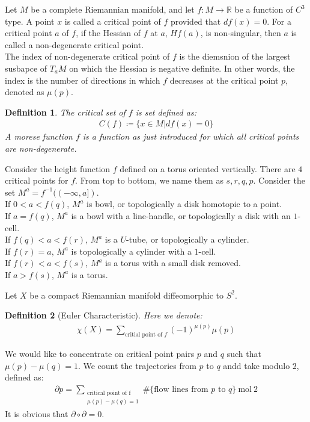 \documentclass[11pt]{book}
\theoremstyle{break}
\theoremstyle{break}
\newtheorem{defn}{Definition}[corL]
\newcommand{\R}{\mathbb{R}}
\newcommand{\pd}{\partial}
\begin{document}
\newpage
Let $M$ be a complete Riemannian manifold, and let $f:M \to \R$ be a function of $C^3$ type. A point $x$ is called a critical point of $f$ provided that $df(x) = 0$. For a critical point $a$ of $f$, if the Hessian of $f$ at $a$, $Hf(a)$, is non-singular, then $a$ is called a non-degenerate critical point.  \\

The index of non-degenerate critical point of $f$ is the diemsnion of the largest susbapce of $T_aM$ on which the Hessian is negative definite. In other words, the index is the number of directions in which $f$ decreases at the critical point $p$, denoted as $\mu(p)$. \\

\begin{defn}
The critical set of $f$ is set defined as:
\begin{align*}
C(f) \coloneqq \{x \in M | df(x) = 0\}
\end{align*}
A morese function $f$ is a function as just introduced for which all critical points are non-degenerate.
\end{defn} 

Consider the height function $f$ defined on a torus oriented vertically. There are $4$ critical points for $f$. From top to bottom, we name them as $s,r,q,p$. Consider the set $M^a = f^{-1}((-\infty, a])$. \\

If $0< a< f(q)$, $M^a$ is bowl, or topologically a disk homotopic to a point. \\

If $a = f(q)$, $M^a$ is a bowl with a line-handle, or topologically a disk with an $1$-cell. \\

If $f(q)<a<f(r)$, $M^a$ is a $U$-tube, or topologically a cylinder. \\

If $f(r) = a$, $M^a$ is topologically a cylinder with a $1$-cell. \\

If $f(r)<a<f(s)$, $M^a$ is a torus with a small disk removed. \\

If $a> f(s)$, $M^a$ is a torus. 
\newpage


Let $X$ be a compact Riemannian manifold diffeomorphic to $S^2$. 


\begin{defn}[Euler Characteristic]
Here we denote:
\begin{align*}
\chi(X) = \sum_{\text{critial point of $f$}}(-1)^{\mu(p)}\mu(p)
\end{align*}
\end{defn}
We would like to concentrate on critical point pairs $p$ and $q$ such that $\mu(p) - \mu(q) = 1$. We count the trajectories from $p$ to $q$ andd take modulo $2$, defined as:
\begin{align*}
\pd p = \sum_{\substack{\text{critical point of f}\\ \mu(p) - \mu(q) = 1}} \#\{\text{flow lines from $p$ to $q$}\}\ \text{mol}\ 2
\end{align*}
It is obvious that $\pd \circ \pd = 0$. \\
\end{document}
